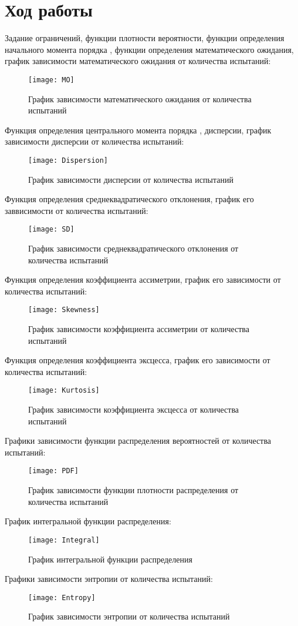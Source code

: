 \documentclass[a4paper,14pt]{extarticle}
\begin{document}
\section{Ход работы}
Задание ограничений, функции плотности вероятности, функции определения
начального момента порядка , функции определения математического
ожидания, график зависимости математического ожидания от количества испытаний:
\begin{figure}[H]
    \centering
    \texttt{[image: MO]}
    \caption{График зависимости математического ожидания от количества испытаний}
\end{figure}
Функция определения центрального момента порядка , дисперсии,
график зависимости дисперсии от количества испытаний:
\begin{figure}[H]
    \centering
    \texttt{[image: Dispersion]}
    \caption{График зависимости дисперсии от количества испытаний}
\end{figure}
Функция определения среднеквадратического отклонения, график его заввисимости
от количества испытаний:
\begin{figure}[H]
    \centering
    \texttt{[image: SD]}
    \caption{График зависимости среднеквадратического отклонения
    от количества испытаний}
\end{figure}
Функция определения коэффициента ассиметрии, график его зависимости
от количества испытаний:
\begin{figure}[H]
    \centering
    \texttt{[image: Skewness]}
    \caption{График зависимости коэффициента ассиметрии
    от количества испытаний}
\end{figure}
Функция определения коэффициента эксцесса, график его зависимости
от количества испытаний:
\begin{figure}[H]
    \centering
    \texttt{[image: Kurtosis]}
    \caption{График зависимости коэффициента эксцесса
    от количества испытаний}
\end{figure}
Графики зависимости функции распределения вероятностей от
количества испытаний:
\begin{figure}[H]
    \centering
    \texttt{[image: PDF]}
    \caption{График зависимости функции плотности распределения
    от количества испытаний}
\end{figure}
График интегральной функции распределения:
\begin{figure}[H]
    \centering
    \texttt{[image: Integral]}
    \caption{График интегральной функции распределения}
\end{figure}
Графики зависимости энтропии от количества испытаний:
\begin{figure}[H]
    \centering
    \texttt{[image: Entropy]}
    \caption{График зависимости энтропии
    от количества испытаний}
\end{figure}
\end{document}
